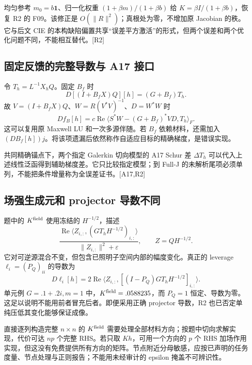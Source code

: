 \documentclass[10pt,a4paper]{article}
\begin{document}
均匀参考 \(m_0=b\mathbf1\)、归一化权重 \((1+\beta m)/(1+\beta b)\) 给
\(K=\beta I/(1+\beta b)\)，恢复 R2 的 F09。该修正是
\(O(\|R\|^2)\)；真根处为零，不增加原 Jacobian 的秩。它与后文 CIE
的本构缺陷偏置共享``误差平方激活''的形式，但两个误差和两个优化问题不同，不能相互替代。{[}R2{]}

\hypertarget{ux56faux5b9aux53cdux9988ux7684ux5b8cux6574ux5bfcux6570ux4e0e-a17-ux63a5ux53e3}{%
\subsection{固定反馈的完整导数与 A17
接口}\label{ux56faux5b9aux53cdux9988ux7684ux5b8cux6574ux5bfcux6570ux4e0e-a17-ux63a5ux53e3}}

令 \(T_h=L^{-1}X_hQ\)。固定 \(B_f\) 时 \[D[(I+B_fX)Q][h]=(G+B_f)T_h.\]
故 \(V=(I+B_fX)Q\)、\(W=R(V^*V)^{-1}\)、\(D=W^*W\) 时
\[Df_B[h]=c\operatorname{Re}\langle S^*W-(G+B_f)^*VD,T_h\rangle_F.\]
这可以复用原 Maxwell LU 和一次多源伴随。若 \(B_f\) 依赖材料，还需加入
\((DB_f[h])j\)。将该项遗漏后依然称作自适应目标的精确梯度，是错误实现。

共同精确锚点下，两个指定 Galerkin 切向模型的 A17 Schur 差 \(\Delta T_h\)
可以代入上述线性泛函得到辅助梯度差。它只比较指定模型；到 Full-J
的未解析尾项必须单列，不能把条件增量称为全误差证书。{[}A17,R2{]}

\hypertarget{ux573aux5f3aux751fux6210ux5143ux548c-projector-ux5bfcux6570ux4e0dux540c}{%
\subsection{场强生成元和 projector
导数不同}\label{ux573aux5f3aux751fux6210ux5143ux548c-projector-ux5bfcux6570ux4e0dux540c}}

题中的 \(K^{\rm field}\) 使用冻结的 \(H^{-1/2}\)，描述
\[\frac{\operatorname{Re}\langle Z_{i,:},(GT_hH^{-1/2})_{i,:}\rangle}
{\|Z_{i,:}\|^2+\varepsilon},\qquad Z=QH^{-1/2}.\]
它对可逆源混合不变，但包含已照明子空间内部的幅度变化。真正的 leverage
\(\ell_i=(P_Q)_{ii}\) 的导数为
\[D\ell_i[h]=2\operatorname{Re}\langle Z_{i,:},[(I-P_Q)GT_hH^{-1/2}]_{i,:}\rangle.\]
单元例 \(G=.1+.2i,m=1\) 中，\(K^{\rm field}=.0588235\)，而 \(P_Q=1\)
恒定、导数为零。这足以说明不能用前者冒充后者。即便采用正确 projector
导数，R2 也已否定单纯压低其变化能够保证成像。

直接逐列构造完整 \(n\times n\) 的 \(K^{\rm field}\)
需要处理全部材料方向；按题中切向求解实现，代价可达 \(np\) 个完整
RHS。若只取 \(Kh\)，可用一个方向的 \(p\) 个 RHS
加场作用实现，但这没有免费提供所有方向的矩阵。节点附近分母敏感，应按已声明的任务度量、节点处理与正则报告；不能用未经审计的
epsilon 掩盖不可辨识性。
\end{document}
